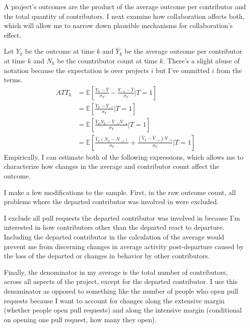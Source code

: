 \documentclass[12pt,notitlepage]{article}
\begin{document}


A project's outcomes are the product of the average outcome per contributor and the total quantity of contributors. I next examine how collaboration affects both, which will allow me to narrow down plausible mechanisms for collaboration's effect.


Let $Y_k$ be the outcome at time $k$ and $\bar Y_k$ be the average outcome per contributor at time $k$ and $N_k$ be the countributor count at time $k$. There's a slight abuse of notation because the expectation is over projects $i$ but I've ommitted $i$ from the terms. 
\begin{align*} 
  ATT_k &= \mathbb{E}\!\left[\frac{Y_k - \bar{Y}}{\sigma_Y}
             - \frac{Y_{-1} - \bar{Y}}{\sigma_Y}
             \Big| T=1\right] \\
           &= \mathbb{E}\!\left[\frac{Y_k - Y_{-1}}{\sigma_Y}
             \Big| T=1\right] \\
           &= \mathbb{E}\!\left[\frac{\bar{Y}_k N_k - \bar{Y}_{-1}N_{-1}}{\sigma_Y}
             \Big| T=1\right] \\
           &= \mathbb{E}\!\left[\frac{\bar Y_k (N_k - N_{-1})}{\sigma_Y}
             + \frac{(\bar Y_k - \bar Y_{-1}) N_{-1}}{\sigma_Y}
             \Big| T=1\right]
\end{align*}
Empirically, I can estimate both of the following expressions, which allows me to characterize how changes in the average and contributor count affect the outcome. 



I make a few modifications to the sample. First, in the raw outcome count, all problems where the departed contributor was involved in were excluded. 

I exclude all pull requests the departed contributor was involved in because I'm interested in how contributors other than the departed react to departure. Including the departed contributor in the calculation of the average would prevent me from discerning changes in average activity post-departure caused by the loss of the departed or changes in behavior by other contributors. 

Finally, the denominator in my average is the total number of contributors, across all aspects of the project, except for the departed contributor. I use this denominator as opposed to something like the number of people who open pull requests because I want to account for changes along the extensive margin (whether people open pull requests) and along the intensive margin (conditional on opening one pull request, how many they open). 
\end{document}
